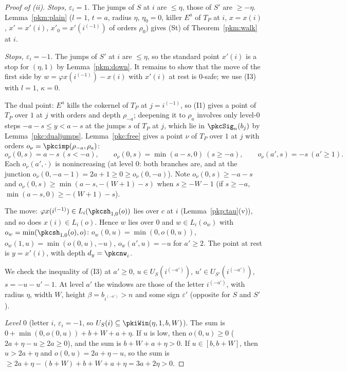 \documentclass[10pt]{amsart}
\theoremstyle{definition}
\theoremstyle{remark}
\begin{document}
\begin{proof}[Proof of (ii)]
\emph{Stops, $\varepsilon_i=1$.} The jumps of $S$ at $i$ are $\le\eta$, those of $S'$ are $\ge-\eta$.
Lemma~\ref{pkm:plain} ($l=1$, $t=a$, radius $\eta$, $\eta_0=0$, killer $E^a$ of $T_P$ at $i$, $x=x(i)$,
$x'=x'(i)$, $x'_0=x'(i^{(-1)})$ of orders $\rho_0$) gives (St) of Theorem~\ref{pkm:walk} at $i$.

\emph{Stops, $\varepsilon_i=-1$.} The jumps of $S'$ at $i$ are $\le\eta$, so the standard point $x'(i)$
is a stop for $(\eta,1)$ by Lemma~\ref{pkm:down}. It remains to show that the move of the first side by
$w=\varphi x(i^{(-1)})-x(i)$ with $x'(i)$ at rest is $0$-safe; we use (I3) with $l=1$, $\kappa=0$.

The dual point: $E^a$ kills the cokernel of $T_P$ at $j=i^{(-1)}$, so (I1) gives a point of $T_P$ over $1$
at $j$ with orders and depth $\rho_{-a}$; deepening it to $\rho_a$ involves only level-$0$ steps
$-a-s\le y<a-s$ at the jumps $s$ of $T_P$ at $j$, which lie in $\pkcSig_n(b_j)$ by
Lemma~\ref{pkc:dualjumps}. Lemma~\ref{pkc:free} gives a point $\nu$ of $T_P$ over $1$ at $j$ with orders
$o_\nu=\pkcimp(\rho_{-a},\rho_a)$:
\[
o_\nu(0,s)=a-s\ (s<-a),\qquad o_\nu(0,s)=\min(a-s,0)\ (s\ge-a),\qquad o_\nu(a',s)=-s\ (a'\ge1).
\]
Each $o_\nu(a',\cdot)$ is nonincreasing (at level $0$: both branches are, and at the junction
$o_\nu(0,-a-1)=2a+1\ge0\ge o_\nu(0,-a)$). Note $o_\nu(0,s)\ge-a-s$ and $o_\nu(0,s)\ge\min(a-s,-(W+1)-s)$
when $s\ge-W-1$ (if $s\ge-a$, $\min(a-s,0)\ge-(W+1)-s$).

The move: $\varphi x(i^{(-1)})\in L_i(\pkcsh_{1,0}(o))$ lies over $c$ at $i$ (Lemma~\ref{pkp:tau}(v)), and
so does $x(i)\in L_i(o)$. Hence $w$ lies over $0$ and $w\in L_i(o_w)$ with
$o_w=\min(\pkcsh_{1,0}(o),o)$: $o_w(0,u)=\min(0,o(0,u))$, $o_w(1,u)=\min(o(0,u),-u)$, $o_w(a',u)=-u$ for
$a'\ge2$. The point at rest is $y=x'(i)$, with depth $d_y=\pkcnw_i$.

We check the inequality of (I3) at $a'\ge0$, $u\in U_S(i^{(-a')})$, $u'\in U_{S'}(i^{(-a')})$, $s=-u-u'-1$.
At level $a'$ the windows are those of the letter $i^{(-a')}$, with radius $\eta$, width $W$, height
$\beta=b_{i^{(-a')}}>n$ and some sign $\varepsilon'$ (opposite for $S$ and $S'$).

\emph{Level $0$} (letter $i$, $\varepsilon_i=-1$, so $U_S(i)\subseteq\pkiWin(\eta,1,b,W)$). The sum is
$0+\min(0,o(0,u))+b+W+a+\eta$. If $u$ is low, then $o(0,u)\ge0$ ($2a+\eta-u\ge2a\ge0$), and the sum is
$b+W+a+\eta>0$. If $u\in[b,b+W]$, then $u>2a+\eta$ and $o(0,u)=2a+\eta-u$, so the sum is
$\ge 2a+\eta-(b+W)+b+W+a+\eta=3a+2\eta>0$.


\end{proof}
\end{document}
